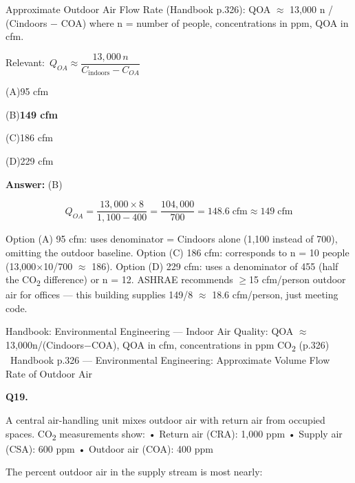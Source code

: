 \documentclass[11pt]{article}
\newcommand{\correct}[1]{\textbf{#1}\;{\color{accent}$\checkmark$}}
\newcommand{\optline}[2]{\par\noindent\hspace{1.2em}(#1)\hspace{0.6em}#2}
\begin{document}
Approximate Outdoor Air Flow Rate (Handbook p.326):
QOA $\approx$ 13,000 n / (Cindoors $-$ COA)
where n = number of people, concentrations in ppm, QOA in cfm.\par\vspace{3pt}
{\small\color{soft}Relevant:}\ $Q_{OA} \approx \dfrac{13{,}000\,n}{C_{\text{indoors}} - C_{OA}}$\par\vspace{3pt}
\optline{A}{95 cfm}
\optline{B}{\correct{149 cfm}}
\optline{C}{186 cfm}
\optline{D}{229 cfm}
\par\vspace{3pt}
\vspace{2pt}\par\noindent\colorbox{boxbg}{\parbox{\dimexpr\linewidth-2\fboxsep\relax}{%
\vspace{2pt}\textbf{Answer:} (B)\par\vspace{2pt}
{\small \[Q_{OA} = \frac{13{,}000\times8}{1{,}100 - 400} = \frac{104{,}000}{700} = 148.6\;\text{cfm} \approx 149\;\text{cfm}\]

Option (A) 95 cfm: uses denominator = Cindoors alone (1,100 instead of 700), omitting the outdoor baseline. Option (C) 186 cfm: corresponds to n = 10 people (13,000$\times$10/700 $\approx$ 186). Option (D) 229 cfm: uses a denominator of 455 (half the CO\textsubscript{2} difference) or n = 12. ASHRAE recommends $\ge$15 cfm/person outdoor air for offices --- this building supplies 149/8 $\approx$ 18.6 cfm/person, just meeting code.}\par\vspace{2pt}
{\footnotesize\color{soft}Handbook: Environmental Engineering --- Indoor Air Quality: QOA $\approx$ 13,000n/(Cindoors$-$COA), QOA in cfm, concentrations in ppm CO\textsubscript{2} (p.326) \textbullet\ Handbook p.326 --- Environmental Engineering: Approximate Volume Flow Rate of Outdoor Air}\vspace{2pt}
}}
\vspace{9pt}
\filbreak
\textbf{\color{accent}Q19.}\par\vspace{2pt}
A central air-handling unit mixes outdoor air with return air from occupied spaces. CO\textsubscript{2} measurements show:
• Return air (CRA): 1,000 ppm
• Supply air (CSA): 600 ppm
• Outdoor air (COA): 400 ppm

The percent outdoor air in the supply stream is most nearly:
\end{document}
